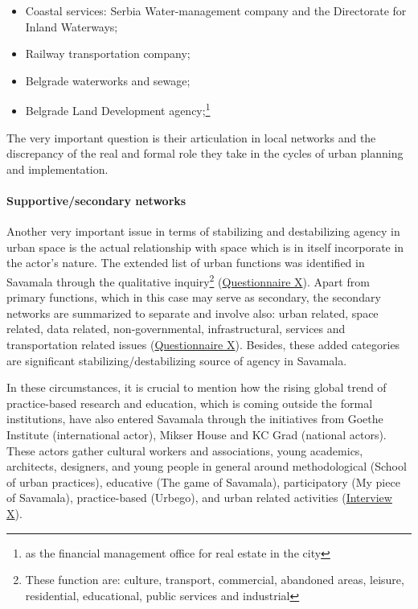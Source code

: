 \documentclass[11pt]{report}
\begin{document}
\begin{itemize}
\item Coastal services: Serbia Water-management company and the Directorate for Inland Waterways;
\item Railway transportation company;
\item Belgrade waterworks and sewage;
\item Belgrade Land Development agency;\footnote{as the financial management office for real estate in the city}
\end{itemize}

The very important question is their articulation in local networks and the discrepancy of the real and formal role they take in the cycles of urban planning and implementation.

\paragraph{Supportive/secondary networks}

Another very important issue in terms of stabilizing and destabilizing agency in urban space is the actual relationship with space which is in itself incorporate in the actor's nature.
The extended list of urban functions was identified in Savamala through the qualitative inquiry\footnote{These function are: culture, transport, commercial, abandoned areas, leisure, residential, educational, public services and industrial}
(\href{Questionnaire Students Savamala}{Questionnaire X}).
Apart from primary functions, which in this case may serve as secondary, the secondary networks are summarized to separate and involve also: urban related, space related, data related, non-governmental, infrastructural, services and transportation related issues (\href{Questionnaire Students Savamala}{Questionnaire X}).
Besides, these added categories are significant stabilizing/destabilizing source of agency in Savamala.

In these circumstances, it is crucial to mention how the rising global trend of practice-based research and education, which is coming outside the formal institutions, have also entered Savamala through the initiatives from Goethe Institute (international actor), Mikser House and KC Grad (national actors). These actors gather cultural workers and associations, young academics, architects, designers, and young people in general around methodological (School of urban practices), educative (The game of Savamala), participatory (My piece of Savamala), practice-based (Urbego), and urban related activities (\href{InterviewX}{Interview X}).
\end{document}

